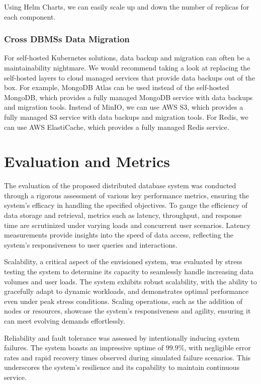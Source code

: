 \documentclass{report}
\begin{document}
    Using Helm Charts, we can easily scale up and down the number of replicas for each component.

    \subsubsection{Cross DBMSs Data Migration}
    For self-hosted Kubernetes solutions, data backup and migration can often be a maintainability nightmare. We would recommend taking a look at replacing the self-hosted layers to cloud managed services that provide data backups out of the box. For example, MongoDB Atlas can be used instead of the self-hosted MongoDB, which provides a fully managed MongoDB service with data backups and migration tools. Instead of MinIO, we can use AWS S3, which provides a fully managed S3 service with data backups and migration tools. For Redis, we can use AWS ElastiCache, which provides a fully managed Redis service.

    \section{Evaluation and Metrics}
    The evaluation of the proposed distributed database system was conducted through a rigorous assessment of various key performance metrics, ensuring the system's efficacy in handling the specified objectives. To gauge the efficiency of data storage and retrieval, metrics such as latency, throughput, and response time are scrutinized under varying loads and concurrent user scenarios. Latency measurements provide insights into the speed of data access, reflecting the system's responsiveness to user queries and interactions.
    
    Scalability, a critical aspect of the envisioned system, was evaluated by stress testing the system to determine its capacity to seamlessly handle increasing data volumes and user loads. The system exhibits robust scalability, with the ability to gracefully adapt to dynamic workloads, and demonstrates optimal performance even under peak stress conditions. Scaling operations, such as the addition of nodes or resources, showcase the system's responsiveness and agility, ensuring it can meet evolving demands effortlessly.
    
    Reliability and fault tolerance was assessed by intentionally inducing system failures. The system boasts an impressive uptime of $ 99.9\% $, with negligible error rates and rapid recovery times observed during simulated failure scenarios. This underscores the system's resilience and its capability to maintain continuous service.
    
\end{document}
